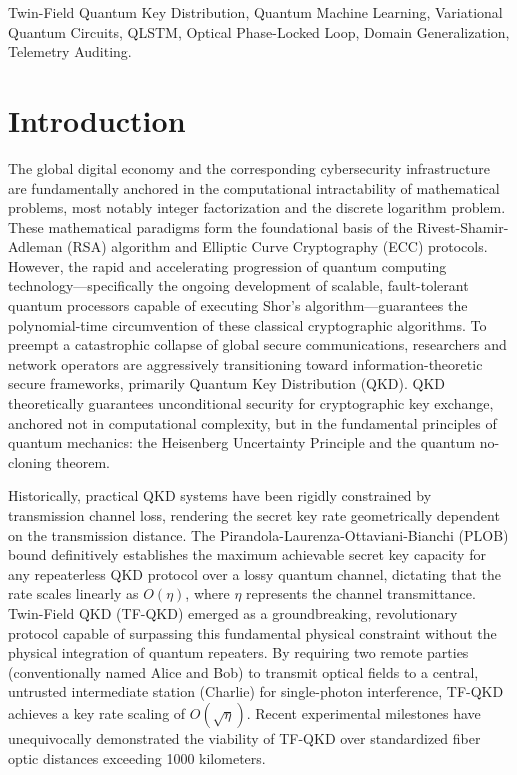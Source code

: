 \documentclass[10pt, journal, letterpaper, twocolumn]{IEEEtran}
\begin{document}
\begin{IEEEkeywords}
Twin-Field Quantum Key Distribution, Quantum Machine Learning, Variational Quantum Circuits, QLSTM, Optical Phase-Locked Loop, Domain Generalization, Telemetry Auditing.
\end{IEEEkeywords}

\section{Introduction}
The global digital economy and the corresponding cybersecurity infrastructure are fundamentally anchored in the computational intractability of mathematical problems, most notably integer factorization and the discrete logarithm problem. These mathematical paradigms form the foundational basis of the Rivest-Shamir-Adleman (RSA) algorithm and Elliptic Curve Cryptography (ECC) protocols. However, the rapid and accelerating progression of quantum computing technology—specifically the ongoing development of scalable, fault-tolerant quantum processors capable of executing Shor's algorithm—guarantees the polynomial-time circumvention of these classical cryptographic algorithms. To preempt a catastrophic collapse of global secure communications, researchers and network operators are aggressively transitioning toward information-theoretic secure frameworks, primarily Quantum Key Distribution (QKD). QKD theoretically guarantees unconditional security for cryptographic key exchange, anchored not in computational complexity, but in the fundamental principles of quantum mechanics: the Heisenberg Uncertainty Principle and the quantum no-cloning theorem.

Historically, practical QKD systems have been rigidly constrained by transmission channel loss, rendering the secret key rate geometrically dependent on the transmission distance. The Pirandola-Laurenza-Ottaviani-Bianchi (PLOB) bound definitively establishes the maximum achievable secret key capacity for any repeaterless QKD protocol over a lossy quantum channel, dictating that the rate scales linearly as $O(\eta)$, where $\eta$ represents the channel transmittance. Twin-Field QKD (TF-QKD) \cite{tfqkd} emerged as a groundbreaking, revolutionary protocol capable of surpassing this fundamental physical constraint without the physical integration of quantum repeaters. By requiring two remote parties (conventionally named Alice and Bob) to transmit optical fields to a central, untrusted intermediate station (Charlie) for single-photon interference, TF-QKD achieves a key rate scaling of $O(\sqrt{\eta})$. Recent experimental milestones have unequivocally demonstrated the viability of TF-QKD over standardized fiber optic distances exceeding 1000 kilometers.
\end{document}
